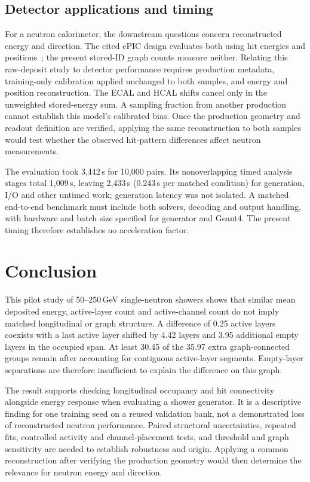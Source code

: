 \documentclass[10pt]{article}
\begin{document}
\subsection{Detector applications and timing}

For a neutron calorimeter, the downstream questions concern reconstructed energy and direction. The cited ePIC design evaluates both using hit energies and positions~\cite{epiczdc}; the present stored-ID graph counts measure neither. Relating this raw-deposit study to detector performance requires production metadata, training-only calibration applied unchanged to both samples, and energy and position reconstruction. The ECAL and HCAL shifts cancel only in the unweighted stored-energy sum. A sampling fraction from another production cannot establish this model's calibrated bias. Once the production geometry and readout definition are verified, applying the same reconstruction to both samples would test whether the observed hit-pattern differences affect neutron measurements.

The evaluation took 3,442\,s for 10,000 pairs. Its nonoverlapping timed analysis stages total 1,009\,s, leaving 2,433\,s (0.243\,s per matched condition) for generation, I/O and other untimed work; generation latency was not isolated. A matched end-to-end benchmark must include both solvers, decoding and output handling, with hardware and batch size specified for generator and Geant4. The present timing therefore establishes no acceleration factor.

\section{Conclusion}

This pilot study of 50--250\,GeV single-neutron showers shows that similar mean deposited energy, active-layer count and active-channel count do not imply matched longitudinal or graph structure. A difference of 0.25 active layers coexists with a last active layer shifted by 4.42 layers and 3.95 additional empty layers in the occupied span. At least 30.45 of the 35.97 extra graph-connected groups remain after accounting for contiguous active-layer segments. Empty-layer separations are therefore insufficient to explain the difference on this graph.

The result supports checking longitudinal occupancy and hit connectivity alongside energy response when evaluating a shower generator. It is a descriptive finding for one training seed on a reused validation bank, not a demonstrated loss of reconstructed neutron performance. Paired structural uncertainties, repeated fits, controlled activity and channel-placement tests, and threshold and graph sensitivity are needed to establish robustness and origin. Applying a common reconstruction after verifying the production geometry would then determine the relevance for neutron energy and direction.
\end{document}
